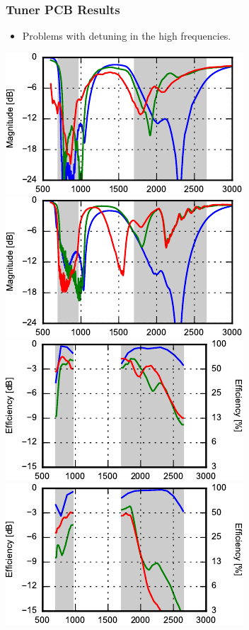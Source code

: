 \begin{frame}
  \frametitle{Tuner PCB Results}
  \begin{itemize}
  \item Problems with detuning in the high frequencies.
  \end{itemize}
  \begin{center}
    \includegraphics[scale=0.33]{img/Lasse/tuner_pcb/001_s11top.pdf}
    \includegraphics[scale=0.33]{img/Lasse/tuner_pcb/001_s11side.pdf} \\
    \includegraphics[scale=0.33]{img/Lasse/tuner_pcb/001_efftop.pdf}
    \includegraphics[scale=0.33]{img/Lasse/tuner_pcb/001_effside.pdf}
  \end{center}
\end{frame}


